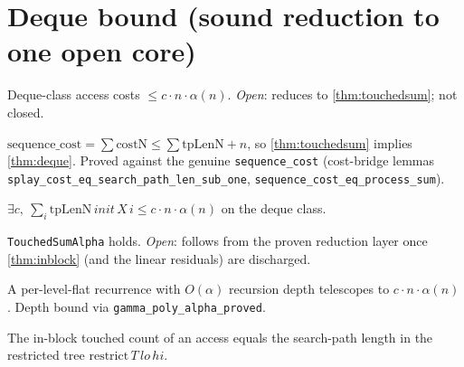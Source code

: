 \section{Deque bound (sound reduction to one open core)}

\begin{theorem}\label{thm:deque}
  Deque-class access costs $\le c\cdot n\cdot\alpha(n)$. \emph{Open}: reduces to
  \ref{thm:touchedsum}; not closed.
\end{theorem}

\begin{lemma}\label{lem:closed}\leanok{}
  $\mathrm{sequence\_cost} = \sum \mathrm{costN} \le \sum \mathrm{tpLenN} + n$,
  so \ref{thm:touchedsum} implies \ref{thm:deque}. Proved against the genuine
  \texttt{sequence\_cost} (cost-bridge lemmas \texttt{splay\_cost\_eq\_search\_path\_len\_sub\_one},
  \texttt{sequence\_cost\_eq\_process\_sum}).
\end{lemma}

\begin{definition}\label{def:touchedsum}\leanok
  $\exists c,\ \sum_i \mathrm{tpLenN}\,init\,X\,i \le c\cdot n\cdot\alpha(n)$ on the
  deque class.
\end{definition}

\begin{theorem}\label{thm:touchedsum}
  \texttt{TouchedSumAlpha} holds. \emph{Open}: follows from the proven reduction
  layer once \ref{thm:inblock} (and the linear residuals) are discharged.
\end{theorem}

\begin{lemma}\label{lem:telescope}\leanok{}
  A per-level-flat recurrence with $O(\alpha)$ recursion depth telescopes to
  $c\cdot n\cdot\alpha(n)$. Depth bound via \texttt{gamma\_poly\_alpha\_proved}.
\end{lemma}

\begin{lemma}\label{lem:step1}\leanok
  The in-block touched count of an access equals the search-path length in the
  restricted tree $\mathrm{restrict}\,T\,lo\,hi$.
\end{lemma}

